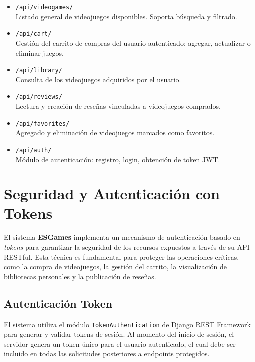 \documentclass{article}
\begin{document}
\begin{itemize}
    \item \texttt{/api/videogames/} \\
    Listado general de videojuegos disponibles. Soporta búsqueda y filtrado.

    \item \texttt{/api/cart/} \\
    Gestión del carrito de compras del usuario autenticado: agregar, actualizar o eliminar juegos.

    \item \texttt{/api/library/} \\
    Consulta de los videojuegos adquiridos por el usuario.

    \item \texttt{/api/reviews/} \\
    Lectura y creación de reseñas vinculadas a videojuegos comprados.

    \item \texttt{/api/favorites/} \\
    Agregado y eliminación de videojuegos marcados como favoritos.

    \item \texttt{/api/auth/} \\
    Módulo de autenticación: registro, login, obtención de token JWT.
\end{itemize}
\section{Seguridad y Autenticación con Tokens}

El sistema \textbf{ESGames} implementa un mecanismo de autenticación basado en \textit{tokens} para garantizar la seguridad de los recursos expuestos a través de su API RESTful. Esta técnica es fundamental para proteger las operaciones críticas, como la compra de videojuegos, la gestión del carrito, la visualización de bibliotecas personales y la publicación de reseñas.

\subsection{Autenticación Token}

El sistema utiliza el módulo \texttt{TokenAuthentication} de Django REST Framework para generar y validar tokens de sesión. Al momento del inicio de sesión, el servidor genera un token único para el usuario autenticado, el cual debe ser incluido en todas las solicitudes posteriores a endpoints protegidos.
\end{document}
